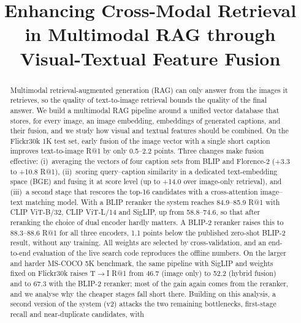 \documentclass[conference]{IEEEtran}
\newcommand{\RA}{\ensuremath{\rightarrow}}
\begin{document}
\title{Enhancing Cross-Modal Retrieval in Multimodal RAG through Visual-Textual Feature Fusion}

\author{
}

\maketitle

\begin{abstract}
Multimodal retrieval-augmented generation (RAG) can only answer from the images it retrieves, so the
quality of text-to-image retrieval bounds the quality of the final answer. We build a multimodal RAG
pipeline around a unified vector database that stores, for every image, an image embedding, embeddings of
generated captions, and their fusion, and we study how visual and textual features should be combined.
On the Flickr30k 1K test set, early fusion of the image vector with a single short caption improves
text-to-image R@1 by only 0.5--2.2 points. Three changes make fusion effective: (i)~averaging the vectors of
four caption sets from BLIP and Florence-2 (+3.3 to +10.8 R@1), (ii)~scoring query--caption similarity in
a dedicated text-embedding space (BGE) and fusing it at score level (up to +14.0 over image-only
retrieval), and (iii)~a second stage that rescores the top-16 candidates with a cross-attention
image--text matching model. With a BLIP reranker the system reaches 84.9--85.9 R@1 with CLIP ViT-B/32,
CLIP ViT-L/14 and SigLIP, up from 58.8--74.6, so that after reranking the choice of dual encoder hardly
matters. A BLIP-2 reranker raises this to 88.3--88.6 R@1 for all three encoders, 1.1 points below the published
zero-shot BLIP-2 result, without any training. All weights are selected by cross-validation, and an
end-to-end evaluation of the live search code reproduces the offline numbers. On the larger and harder
MS-COCO 5K benchmark, the same pipeline with SigLIP and weights fixed on Flickr30k raises T\RA I R@1 from
46.7 (image only) to 52.2 (hybrid fusion) and to 67.3 with the BLIP-2 reranker; most of the gain again comes from the
reranker, and we analyse why the cheaper stages fall short there. Building on this analysis, a second version
of the system (v2) attacks the two remaining bottlenecks, first-stage recall and near-duplicate candidates, with

\end{abstract}
\end{document}
